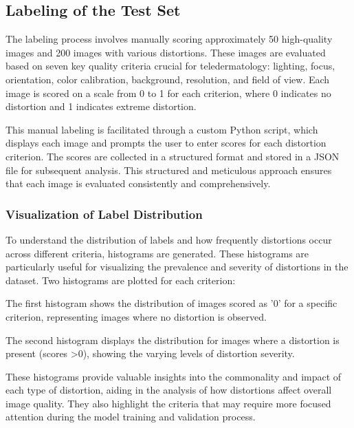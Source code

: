 \subsection{Labeling of the Test Set}
\label{sub:ImgLabel}
The labeling process involves manually scoring approximately 50 high-quality images and 200 images with various distortions. These images are evaluated based on seven key quality criteria crucial for teledermatology: lighting, focus, orientation, color calibration, background, resolution, and field of view. Each image is scored on a scale from 0 to 1 for each criterion, where 0 indicates no distortion and 1 indicates extreme distortion. \par
\vspace{\baselineskip}
\noindent
This manual labeling is facilitated through a custom Python script, which displays each image and prompts the user to enter scores for each distortion criterion. The scores are collected in a structured format and stored in a JSON file for subsequent analysis. This structured and meticulous approach ensures that each image is evaluated consistently and comprehensively.\par
\noindent
\subsubsection{Visualization of Label Distribution}
\label{subsub:VizTestLabel}
To understand the distribution of labels and how frequently distortions occur across different criteria, histograms are generated. These histograms are particularly useful for visualizing the prevalence and severity of distortions in the dataset. Two histograms are plotted for each criterion:\par
\vspace{\baselineskip}
\noindent
The first histogram shows the distribution of images scored as '0' for a specific criterion, representing images where no distortion is observed. \par
\noindent
The second histogram displays the distribution for images where a distortion is present (scores >0), showing the varying levels of distortion severity.\par
\vspace{\baselineskip}
\noindent
These histograms provide valuable insights into the commonality and impact of each type of distortion, aiding in the analysis of how distortions affect overall image quality. They also highlight the criteria that may require more focused attention during the model training and validation process. \par
{}

